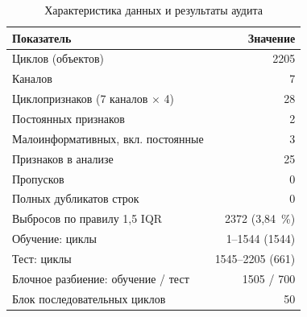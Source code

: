 \begin{table}[H]
\centering
\small
\caption{Характеристика данных и результаты аудита}\label{tab:data}
\begin{tabular}{lr}
\toprule
Показатель & Значение \\
\midrule
Циклов (объектов) & 2205 \\
Каналов & 7 \\
Циклопризнаков (7 каналов $\times$ 4) & 28 \\
Постоянных признаков & 2 \\
Малоинформативных, вкл. постоянные & 3 \\
Признаков в анализе & 25 \\
Пропусков & 0 \\
Полных дубликатов строк & 0 \\
Выбросов по правилу 1,5 IQR & 2372 (3,84~\%) \\
\midrule
Обучение: циклы & 1--1544 (1544) \\
Тест: циклы & 1545--2205 (661) \\
Блочное разбиение: обучение / тест & 1505 / 700 \\
Блок последовательных циклов & 50 \\
\bottomrule
\end{tabular}
\end{table}
